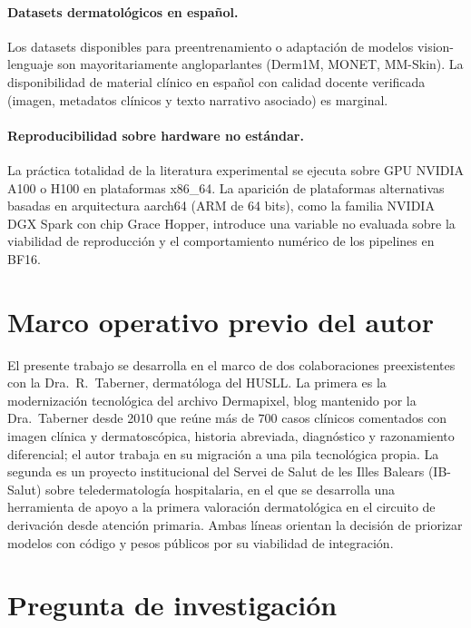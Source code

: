 \paragraph{Datasets dermatológicos en español.}
Los datasets disponibles para preentrenamiento o adaptación de
modelos vision-lenguaje son mayoritariamente angloparlantes
(Derm1M, MONET, MM-Skin). La disponibilidad de material clínico en
español con calidad docente verificada (imagen, metadatos clínicos
y texto narrativo asociado) es marginal.

\paragraph{Reproducibilidad sobre hardware no estándar.}
La práctica totalidad de la literatura experimental se ejecuta
sobre GPU NVIDIA A100 o H100 en plataformas x86\_64. La aparición
de plataformas alternativas basadas en arquitectura aarch64 (ARM de
64 bits), como la familia NVIDIA DGX Spark con chip Grace Hopper,
introduce una variable no evaluada sobre la viabilidad de
reproducción y el comportamiento numérico de los pipelines en BF16.

\section{Marco operativo previo del autor}
\label{sec:trabajo-previo}

El presente trabajo se desarrolla en el marco de dos colaboraciones
preexistentes con la Dra.~R.~Taberner, dermatóloga del HUSLL. La
primera es la modernización tecnológica del archivo Dermapixel,
blog mantenido por la Dra.~Taberner desde 2010 que reúne más de
$700$ casos clínicos comentados con imagen clínica y
dermatoscópica, historia abreviada, diagnóstico y razonamiento
diferencial; el autor trabaja en su migración a una pila
tecnológica propia. La segunda es un proyecto institucional del
Servei de Salut de les Illes Balears (IB-Salut) sobre
teledermatología hospitalaria, en el que se desarrolla una
herramienta de apoyo a la primera valoración dermatológica en el
circuito de derivación desde atención primaria. Ambas líneas
orientan la decisión de priorizar modelos con código y pesos
públicos por su viabilidad de integración.

\section{Pregunta de investigación}
\label{sec:pregunta}

